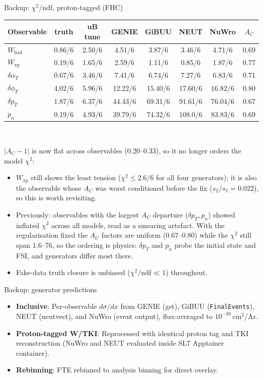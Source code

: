 \documentclass[aspectratio=169,10pt]{beamer}
\begin{document}
{\begin{frame}{Backup: $\chi^2/\mathrm{ndf}$, proton-tagged (FHC)}
  \centering\scriptsize
  \begin{tabular}{lcccccc|c}
  \toprule
  Observable & truth & uB tune & GENIE & GiBUU & NEUT & NuWro & $A_C$\\\midrule
  $W_\mathrm{had}$   & 0.86/6 & 2.50/6 & 4.51/6 & 3.87/6 & 3.46/6 & 4.71/6 & 0.69\\
  $W_{\pi p}$        & 0.19/6 & 1.65/6 & 2.59/6 & 1.11/6 & 0.85/6 & 1.87/6 & 0.77\\
  $\delta\alpha_T$   & 0.67/6 & 3.46/6 & 7.41/6 & 6.74/6 & 7.27/6 & 6.83/6 & 0.71\\
  $\delta\phi_T$     & 4.02/6 & 5.96/6 & 12.22/6 & 15.40/6 & 17.60/6 & 16.82/6 & 0.80\\
  $\delta p_T$       & 1.87/6 & 6.37/6 & \alert{44.43/6} & \alert{69.31/6} & \alert{91.61/6} & \alert{76.04/6} & 0.67\\
  $p_n$              & 0.19/6 & 4.93/6 & \alert{39.79/6} & \alert{74.32/6} & \alert{108.0/6} & \alert{83.83/6} & 0.69\\
  \bottomrule
  \end{tabular}\\[2mm]
  {\scriptsize $|A_C-1|$ is now \alert{flat} across observables ($0.20$--$0.33$), so it no longer orders the model $\chi^2$:
  \begin{itemize}\setlength\itemsep{1pt}
    \item $W_{\pi p}$ still shows the least tension ($\chi^2 \le 2.6/6$ for all four generators); it is also the observable whose $A_C$ was worst conditioned before the fix ($s_2/s_1 = 0.022$), so this is worth revisiting.
    \item \alert{Previously}: observables with the largest $A_C$ departure ($\delta p_T, p_n$) showed inflated $\chi^2$ across all models, read as a smearing artefact. With the regularisation fixed the $A_C$ factors are uniform ($0.67$--$0.80$) while the $\chi^2$ still span $1.6$--$76$, so the ordering is \alert{physics}: $\delta p_T$ and $p_n$ probe the initial state and FSI, and generators differ most there.
    \item Fake-data truth closure is unbiased ($\chi^2/\mathrm{ndf} \ll 1$) throughout.
  \end{itemize}}
\end{frame}

\begin{frame}{Backup: generator predictions}
  \small
  \begin{itemize}\setlength\itemsep{3pt}
    \item \textbf{Inclusive}: Per-observable $d\sigma/dx$ from GENIE (gst), GiBUU (\texttt{FinalEvents}), NEUT (neutvect), and NuWro (event output), flux-averaged to $10^{-38}$\,cm$^2$/Ar.
    \item \textbf{Proton-tagged W/TKI}: Reprocessed with identical proton tag and TKI reconstruction (NuWro and NEUT evaluated inside SL7 Apptainer container).
    \item \textbf{Rebinning}: FTE rebinned to analysis binning for direct overlay.
  \end{itemize}
\end{frame}
}
\end{document}
